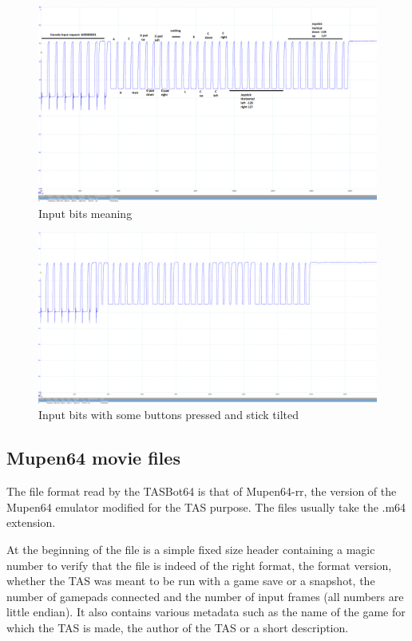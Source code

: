 \documentclass[a4paper,oneside,12pt]{article}
\begin{document}
\begin{figure}
  \includegraphics[width=\textwidth]{input_legend.png}
  \caption{Input bits meaning}
  \label{input_legend}
\end{figure}

\begin{figure}
  \includegraphics[width=\textwidth]{some_input.png}
  \caption{Input bits with some buttons pressed and stick tilted}
  \label{some_input}
\end{figure}

\subsection{Mupen64 movie files}
The file format read by the TASBot64 is that of Mupen64-rr, the version of the
Mupen64 emulator modified for the TAS purpose. The files usually take the .m64
extension.

At the beginning of the file is a simple fixed size header containing a magic
number to verify that the file is indeed of the right format, the format
version, whether the TAS was meant to be run with a game save or a snapshot, the
number of gamepads connected and the number of input frames (all numbers are
little endian). It also contains various metadata such as the name of the game
for which the TAS is made, the author of the TAS or a short description.
\end{document}
